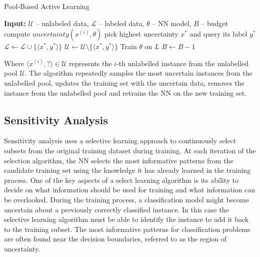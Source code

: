 \documentclass[conference]{IEEEtran}
\begin{document}
	\begin{algorithm}[H]
		\caption{Pool-Based Active Learning}
		\label{alg:pool}
		\begin{algorithmic}[1]
			\State\textbf{Input:} $\mathcal{U}$ -- unlabeled data, $\mathcal{L}$ -- labeled data, $\theta$ -- NN model, $B$ -- budget
			\Repeat
			\State compute $uncertainty(x^{(i)}, \theta)$
			\EndFor
			\State pick highest uncertainty $x^{*}$ and query its label $y^{*}$
			\State $\mathcal{L} \gets \mathcal{L} \cup \{\langle x^{*}, y^{*}\rangle\}$
			\State $\mathcal{U} \gets \mathcal{U} \setminus \{\langle x^{*}, y^{*}\rangle\}$
			\State Train $\theta$ on $L$
			\State $B \gets B - 1$
		\end{algorithmic}
	\end{algorithm}
	
	Where $\langle x^{(i)}, ? \rangle \in \mathcal{U}$ represents the $i$-th unlabelled instance from the unlabelled pool $\mathcal{U}$. The algorithm repeatedly samples the most uncertain instances from the unlabelled pool, updates the training set with the uncertain data, removes the instance from the unlabelled pool and retrains the NN on the new training set.
	
	\subsection{Sensitivity Analysis}
	Sensitivity analysis uses a selective learning approach to continuously select subsets from the original training dataset during training. At each iteration of the selection algorithm, the NN selects the most informative patterns from the candidate training set using the knowledge it has already learned in the training process. One of the key aspects of a select learning algorithm is its ability to decide on what information should be used for training and what information can be overlooked. During the training process, a classification model might become uncertain about a previously correctly classified instance. In this case the selective learning algorithm must be able to identify the instance to add it back to the training subset. The most informative patterns for classification problems are often found near the decision boundaries, referred to as the region of uncertainty.
	
\end{document}
